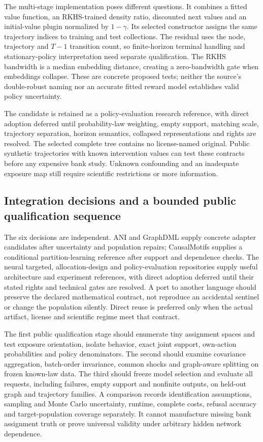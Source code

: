 The multi-stage implementation poses different questions. It combines a fitted value function, an RKHS-trained density ratio, discounted next values and an initial-value plugin normalized by $1-\gamma$. Its selected constructor assigns the same trajectory indices to training and test collections. The residual uses the node, trajectory and $T-1$ transition count, so finite-horizon terminal handling and stationary-policy interpretation need separate qualification. The RKHS bandwidth is a median embedding distance, creating a zero-bandwidth gate when embeddings collapse. These are concrete proposed tests; neither the source's double-robust naming nor an accurate fitted reward model establishes valid policy uncertainty.~\citep{exec25_pnet_pie}

The candidate is retained as a policy-evaluation research reference, with direct adoption deferred until probability-law weighting, empty support, matching scale, trajectory separation, horizon semantics, collapsed representations and rights are resolved. The selected complete tree contains no license-named original. Public synthetic trajectories with known intervention values can test these contracts before any expensive bank study. Unknown confounding and an inadequate exposure map still require scientific restrictions or more information.~\citep{exec25_pnet_choice}

\subsection{Integration decisions and a bounded public qualification sequence}

The six decisions are independent. ANI and GraphDML supply concrete adapter candidates after uncertainty and population repairs; CausalMotifs supplies a conditional partition-learning reference after support and dependence checks. The neural targeted, allocation-design and policy-evaluation repositories supply useful architecture and experiment references, with direct adoption deferred until their stated rights and technical gates are resolved. A port to another language should preserve the declared mathematical contract, not reproduce an accidental sentinel or change the population silently. Direct reuse is preferred only when the actual artifact, license and scientific regime meet that contract.~\citep{exec25_pnet_choice}

The first public qualification stage should enumerate tiny assignment spaces and test exposure orientation, isolate behavior, exact joint support, own-action probabilities and policy denominators. The second should examine covariance aggregation, batch-order invariance, common shocks and graph-aware splitting on frozen known-law data. The third should freeze model selection and evaluate all requests, including failures, empty support and nonfinite outputs, on held-out graph and trajectory families. A comparison records identification assumptions, sampling and Monte Carlo uncertainty, runtime, complete costs, refusal accuracy and target-population coverage separately. It cannot manufacture missing bank assignment truth or prove universal validity under arbitrary hidden network dependence.~\citep{exec25_pnet_choice}

